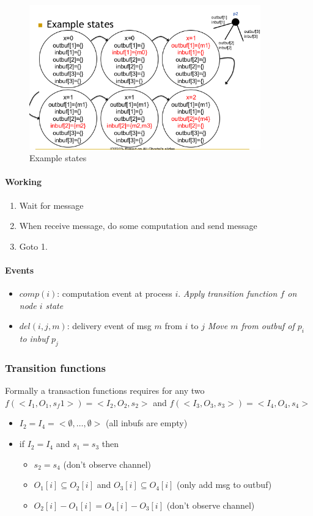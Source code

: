 \begin{figure}[!ht]
    \centering
    \includegraphics[width=10cm]{img/node.png}
    \caption{Example states}
\end{figure}
\FloatBarrier{}

\paragraph{Working}
\begin{enumerate}
    \item Wait for message
    \item When receive message, do some computation and send message
    \item Goto 1.
\end{enumerate}

\paragraph{Events}
\begin{itemize}
    \item $comp(i)$: computation event at process $i$.
        \subitem{} \textit{Apply transition function $f$ on node $i$ state}
    \item $del(i, j, m)$: delivery event of msg $m$ from $i$ to $j$
        \subitem{} \textit{Move $m$ from outbuf of $p_i$ to inbuf $p_j$}
\end{itemize}

\subsubsection{Transition functions}

Formally a transaction functions requires for any two
$f(<I_1,O_1,s_f1>)=<I_2,O_2,s_2>$ and $f(<I_3,O_3,s_3>)=<I_4,O_4,s_4>$
\begin{itemize}
	\item $I_2=I_4 =<\emptyset,\ldots,\emptyset>$ (all inbufs are empty)
	\item if $I_2=I_4$ and $s_1=s_3$ then
	\begin{itemize}
		\item $s_2=s_4$ (don't observe channel)
		\item $O_1[i] \subseteq O_2[i]$ and $O_3[i] \subseteq O_4[i]$
		(only add msg to outbuf)
		\item $O_2[i]-O_1[i] = O_4[i]-O_3[i]$ (don't observe channel)
	\end{itemize}
\end{itemize}


